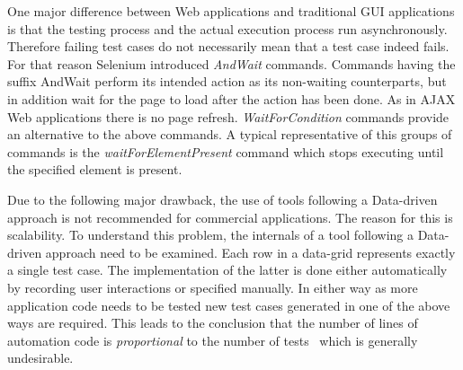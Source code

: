 \documentclass[12pt, notitlepage]{article}
\begin{document}

One major difference between Web applications and traditional GUI applications is that the testing process and the actual execution process run asynchronously. Therefore failing test cases do not necessarily mean that a test case indeed fails. For that reason 
Selenium introduced \textit{AndWait} commands. Commands having the suffix AndWait perform its intended action as its
non-waiting counterparts, but in addition wait for the page to load after the action has been done. As in AJAX Web applications there
is no page refresh. \textit{WaitForCondition} commands provide an alternative to the above commands. A typical representative of
this groups of commands is the \textit{waitForElementPresent} command which stops executing until the specified element is present.

Due to the following major drawback, the use of tools following a Data-driven approach is not recommended for commercial applications. The reason for this
is scalability. To understand this problem, the internals of a tool following a Data-driven approach need to be examined. Each row in a data-grid represents exactly 
a single test case. The implementation of the latter is done either automatically by recording user interactions or specified manually.
In either way as more application code needs to be tested new test cases generated in one of the above ways are required. 
This leads to the conclusion that the number of lines of automation code is \textit{proportional} to the number of tests~\cite{record-playback} which is generally 
undesirable. 
\end{document}
